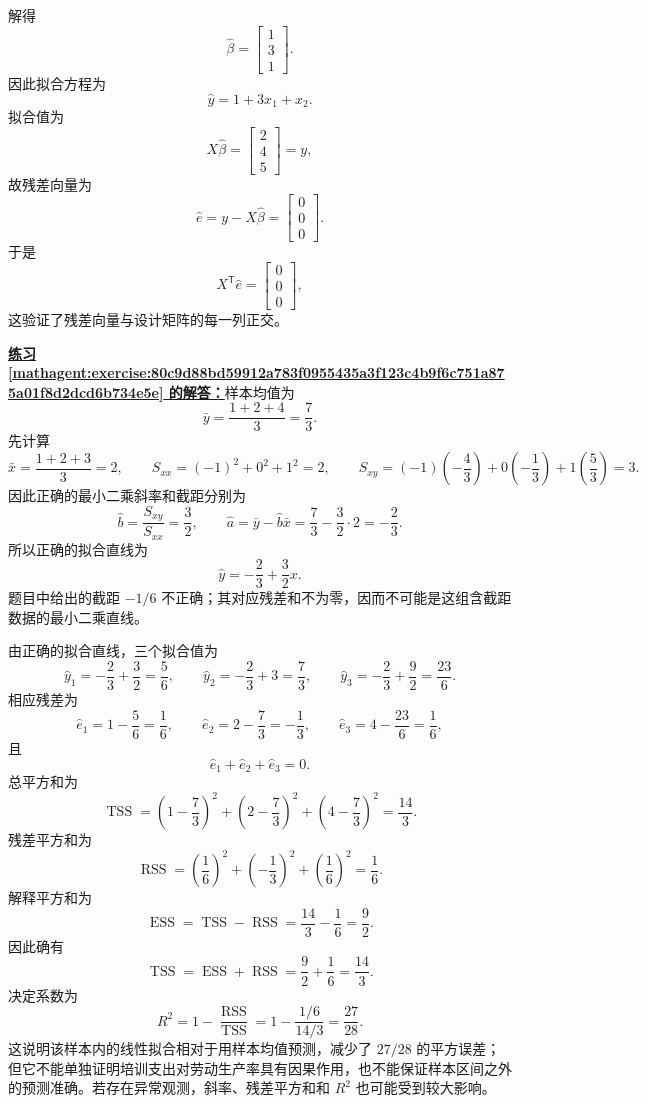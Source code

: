 \documentclass[UTF8,fontset=fandol,11pt]{ctexart}
\begin{document}
解得
\[
\hat\beta=
\begin{bmatrix}1\\3\\1\end{bmatrix}.
\]
因此拟合方程为
\[
\hat y=1+3x_1+x_2.
\]
拟合值为
\[
X\hat\beta=
\begin{bmatrix}2\\4\\5\end{bmatrix}=y,
\]
故残差向量为
\[
\hat e=y-X\hat\beta=
\begin{bmatrix}0\\0\\0\end{bmatrix}.
\]
于是
\[
X^{\mathsf T}\hat e=
\begin{bmatrix}0\\0\\0\end{bmatrix},
\]
这验证了残差向量与设计矩阵的每一列正交。\par
\par\noindent\textbf{\hyperref[mathagent:exercise:80c9d88bd59912a783f0955435a3f123c4b9f6c751a875a01f8d2dcd6b734e5e]{练习 \ref*{mathagent:exercise:80c9d88bd59912a783f0955435a3f123c4b9f6c751a875a01f8d2dcd6b734e5e} 的解答：}}样本均值为
\[
\bar y=\frac{1+2+4}{3}=\frac{7}{3}.
\]
先计算
\[
\bar x=\frac{1+2+3}{3}=2,
\qquad
S_{xx}=(-1)^2+0^2+1^2=2,
\qquad
S_{xy}=(-1)\left(-\frac{4}{3}\right)+0\left(-\frac{1}{3}\right)+1\left(\frac{5}{3}\right)=3.
\]
因此正确的最小二乘斜率和截距分别为
\[
\hat b=\frac{S_{xy}}{S_{xx}}=\frac{3}{2},
\qquad
\hat a=\bar y-\hat b\bar x
=\frac{7}{3}-\frac{3}{2}\cdot2=-\frac{2}{3}.
\]
所以正确的拟合直线为
\[
\hat y=-\frac{2}{3}+\frac{3}{2}x.
\]
题目中给出的截距 $-1/6$ 不正确；其对应残差和不为零，因而不可能是这组含截距数据的最小二乘直线。

由正确的拟合直线，三个拟合值为
\[
\hat y_1=-\frac{2}{3}+\frac{3}{2}=\frac{5}{6},
\qquad
\hat y_2=-\frac{2}{3}+3=\frac{7}{3},
\qquad
\hat y_3=-\frac{2}{3}+\frac{9}{2}=\frac{23}{6}.
\]
相应残差为
\[
\hat e_1=1-\frac{5}{6}=\frac{1}{6},
\qquad
\hat e_2=2-\frac{7}{3}=-\frac{1}{3},
\qquad
\hat e_3=4-\frac{23}{6}=\frac{1}{6},
\]
且
\[
\hat e_1+\hat e_2+\hat e_3=0.
\]
总平方和为
\[
\operatorname{TSS}
=\left(1-\frac{7}{3}\right)^2
+\left(2-\frac{7}{3}\right)^2
+\left(4-\frac{7}{3}\right)^2
=\frac{14}{3}.
\]
残差平方和为
\[
\operatorname{RSS}
=\left(\frac{1}{6}\right)^2
+\left(-\frac{1}{3}\right)^2
+\left(\frac{1}{6}\right)^2
=\frac{1}{6}.
\]
解释平方和为
\[
\operatorname{ESS}=\operatorname{TSS}-\operatorname{RSS}
=\frac{14}{3}-\frac{1}{6}=\frac{9}{2}.
\]
因此确有
\[
\operatorname{TSS}=\operatorname{ESS}+\operatorname{RSS}
=\frac{9}{2}+\frac{1}{6}=\frac{14}{3}.
\]
决定系数为
\[
R^2=1-\frac{\operatorname{RSS}}{\operatorname{TSS}}
=1-\frac{1/6}{14/3}
=\frac{27}{28}.
\]
这说明该样本内的线性拟合相对于用样本均值预测，减少了 $27/28$ 的平方误差；但它不能单独证明培训支出对劳动生产率具有因果作用，也不能保证样本区间之外的预测准确。若存在异常观测，斜率、残差平方和和 $R^2$ 也可能受到较大影响。\par
\end{document}
